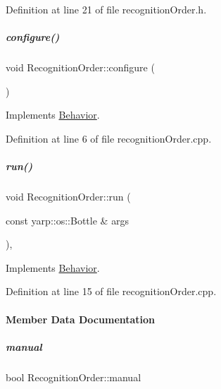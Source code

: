 Definition at line 21 of file recognition\+Order.\+h.

\mbox{\label{group__behaviorManager_a617221425cec2b16576e02797b788b9f}} 
\subparagraph{\texorpdfstring{configure()}{configure()}}
{\footnotesize\ttfamily void Recognition\+Order\+::configure (\begin{DoxyParamCaption}{ }\end{DoxyParamCaption})\hspace{0.3cm}{\ttfamily [virtual]}}



Implements \hyperlink{group__behaviorManager_a30484d4d6de3c0689de4f60da3efbab8}{Behavior}.



Definition at line 6 of file recognition\+Order.\+cpp.

\mbox{\label{group__behaviorManager_a0a095aa1af770bac92f30042cee21e3a}} 
\subparagraph{\texorpdfstring{run()}{run()}}
{\footnotesize\ttfamily void Recognition\+Order\+::run (\begin{DoxyParamCaption}\item[{const yarp\+::os\+::\+Bottle \&}]{args }\end{DoxyParamCaption})\hspace{0.3cm}{\ttfamily [protected]}, {\ttfamily [virtual]}}



Implements \hyperlink{group__behaviorManager_a7dfd81b30f9ddf1864093626650751c3}{Behavior}.



Definition at line 15 of file recognition\+Order.\+cpp.



\paragraph{Member Data Documentation}
\mbox{\label{group__behaviorManager_a8c7cf2790adc7f55a3013450659973f8}} 
\subparagraph{\texorpdfstring{manual}{manual}}
{\footnotesize\ttfamily bool Recognition\+Order\+::manual}



